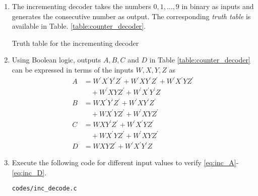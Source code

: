 \renewcommand{\theequation}{\theenumi}
\renewcommand{\thefigure}{\theenumi}
\begin{enumerate}[label=\thesection.\arabic*.,ref=\thesection.\theenumi]

\item The incrementing decoder   takes the numbers $0,1,\dots,9$ in binary as inputs and generates
the consecutive number as output.  The corresponding {\em truth table} is available in Table. \ref{table:counter_decoder}.
\begin{table}[!h]
\centering

\caption{Truth table for the incrementing decoder}
\label{table:counter_decoder}
\end{table}
\item Using Boolean logic, outputs $A, B, C$ and $D$  in Table \ref{table:counter_decoder} can be expressed in terms of the inputs $W,X,Y,Z$ as
%
\begin{align}
\label{eq:inc_A}
A &= W^{\prime}X^{\prime}Y^{\prime}Z^{\prime} + W^{\prime}XY^{\prime}Z^{\prime}
+W^{\prime}X^{\prime}YZ^{\prime}
\nonumber \\
 & \quad +W^{\prime}XYZ^{\prime}
+W^{\prime}X^{\prime}Y^{\prime}Z
\\
\label{eq:inc_B}
B &= WX^{\prime}Y^{\prime}Z^{\prime} + W^{\prime}XY^{\prime}Z^{\prime}
\nonumber \\ 
& \quad 
+WX^{\prime}YZ^{\prime}
+W^{\prime}XYZ^{\prime}
\\
\label{eq:inc_C}
C &= WXY^{\prime}Z^{\prime} + W^{\prime}X^{\prime}YZ^{\prime}
\nonumber \\ 
& \quad 
+WX^{\prime}YZ^{\prime}
+W^{\prime}XYZ^{\prime}
\\
D &= WXYZ^{\prime} + W^{\prime}X^{\prime}Y^{\prime}Z
\label{eq:inc_D}
\end{align}
\item Execute the following code for different input values to verify \eqref{eq:inc_A}-\eqref{eq:inc_D}.
\label{code:inc_decode}
\begin{lstlisting}
codes/inc_decode.c
\end{lstlisting}
%
%

\end{enumerate}
%
%
